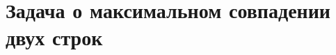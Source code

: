 \documentclass[discrete.tex]{subfiles}
\begin{document}
\section{Задача о максимальном совпадении двух строк}
\end{document}
